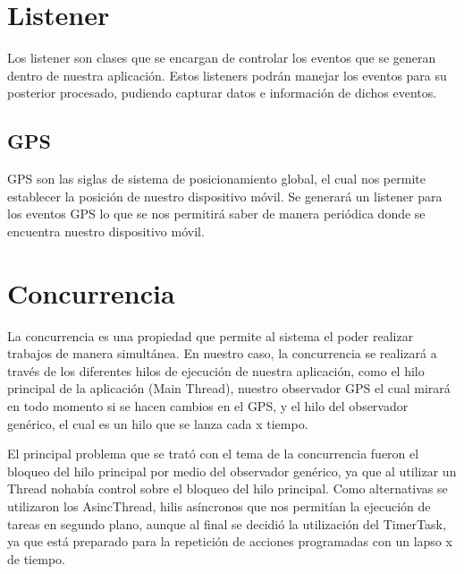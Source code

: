 \section{Listener}

Los listener son clases que se encargan de controlar los eventos que se generan dentro de nuestra aplicación.
Estos listeners podrán manejar los eventos para su posterior procesado, pudiendo capturar datos e información de dichos eventos.

\subsection{GPS}

GPS son las siglas de sistema de posicionamiento global, el cual nos permite establecer la posición de nuestro dispositivo móvil.
Se generará un listener para los eventos GPS lo que se nos permitirá saber de manera periódica donde se encuentra nuestro dispositivo móvil.

\section{Concurrencia}
La concurrencia es una propiedad que permite al sistema el poder realizar trabajos de manera simultánea. En nuestro caso, la concurrencia se realizará a través de los diferentes hilos de ejecución de nuestra aplicación, como el hilo principal de la aplicación (Main Thread), nuestro observador GPS el cual mirará en todo momento si se hacen cambios en el GPS, y el hilo del observador genérico, el cual es un hilo que se lanza cada x tiempo.

El principal problema que se trató con el tema de la concurrencia fueron el bloqueo del hilo principal por medio del observador genérico, ya que al utilizar un Thread nohabía control sobre el bloqueo del hilo principal. Como alternativas se utilizaron los AsincThread, hilis asíncronos que nos permitían la ejecución de tareas en segundo plano, aunque al final se decidió la utilización del TimerTask, ya que está preparado para la repetición de acciones programadas con un lapso x de tiempo.